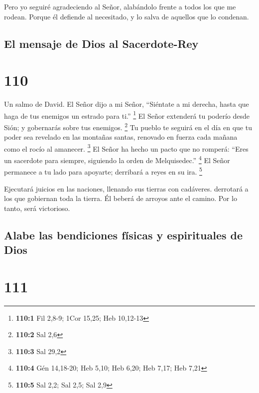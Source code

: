  Pero yo seguiré agradeciendo al Señor, alabándolo frente a
todos los que me rodean.  Porque él defiende al necesitado,
y lo salva de aquellos que lo condenan.

\hypertarget{el-mensaje-de-dios-al-sacerdote-rey}{%
\subsection{El mensaje de Dios al
Sacerdote-Rey}\label{el-mensaje-de-dios-al-sacerdote-rey}}

\hypertarget{section-109}{%
\section{110}\label{section-109}}

Un salmo de David.  El Señor dijo a mi Señor, ``Siéntate a
mi derecha, hasta que haga de tus enemigos un estrado para ti.''
\footnote{\textbf{110:1} Fil 2,8-9; 1Cor 15,25; Heb 10,12-13}
 El Señor extenderá tu poderío desde Sión; y gobernarás
sobre tus enemigos. \footnote{\textbf{110:2} Sal 2,6}  Tu
pueblo te seguirá en el día en que tu poder sea revelado en las montañas
santas, renovado en fuerza cada mañana como el rocío al amanecer.
\footnote{\textbf{110:3} Sal 29,2}  El Señor ha hecho un
pacto que no romperá: ``Eres un sacerdote para siempre, siguiendo la
orden de Melquisedec.'' \footnote{\textbf{110:4} Gén 14,18-20; Heb 5,10;
  Heb 6,20; Heb 7,17; Heb 7,21}  El Señor permanece a tu
lado para apoyarte; derribará a reyes en su ira. \footnote{\textbf{110:5}
  Sal 2,2; Sal 2,5; Sal 2,9}

 Ejecutará juicios en las naciones, llenando sus tierras con
cadáveres. derrotará a los que gobiernan toda la tierra.  Él
beberá de arroyos ante el camino. Por lo tanto, será victorioso.

\hypertarget{alabe-las-bendiciones-fuxedsicas-y-espirituales-de-dios}{%
\subsection{Alabe las bendiciones físicas y espirituales de
Dios}\label{alabe-las-bendiciones-fuxedsicas-y-espirituales-de-dios}}

\hypertarget{section-110}{%
\section{111}\label{section-110}}

